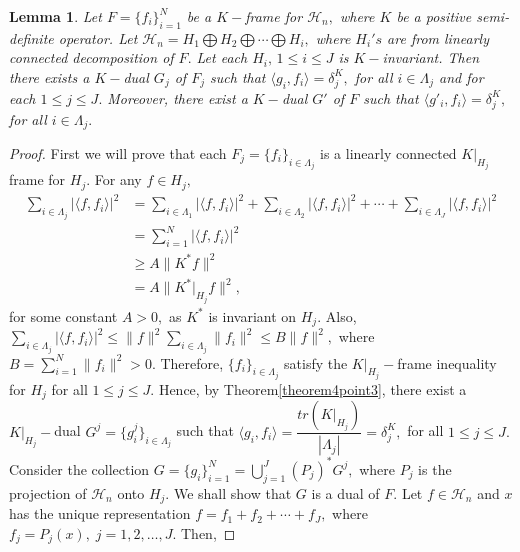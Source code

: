 \documentclass[final,1p,times]{elsarticle}
\newtheorem{lem}[thm]{Lemma}
\begin{document}
\begin{lem}\label{lemma4point10}
		Let $F = \{f_i\}_{i=1}^N $ be a $K-$frame for $\mathcal{H}_n,$ where $K$ be a positive semi-definite operator. Let $\mathcal{H}_n = H_1 \bigoplus H_2 \bigoplus \cdots \bigoplus H_i,$ where  ${H_i}'s$ are from linearly connected decomposition of $F.$ Let each $H_i,\,1\leq i \leq J$ is $K-$invariant. Then there exists a $K-$dual $G_j$ of $F_j$ such that $\langle g_i, f_i \rangle = \delta_{j}^K,$ for all $i \in \Lambda_j$ and for each $1 \leq j \leq J.$
		Moreover, there exist a $K-$dual $G'$ of $F$ such that $\langle g'_i , f_i \rangle = \delta_{j}^K,$ for all $i \in \Lambda_j.$ 
\end{lem}

\begin{proof}
	First we will prove that each $F_j = \{f_i\}_{i \in \Lambda_j}  $ is a linearly connected $K|_{H_j}$ frame for $H_j.$ For any $f \in H_j,$
	\begin{align*}
		\sum\limits_{i \in \Lambda_j}|\langle f,f_i \rangle|^2 &= \sum\limits_{i \in \Lambda_1}|\langle f,f_i \rangle|^2 + \sum\limits_{i \in \Lambda_2}|\langle f,f_i \rangle|^2 + \cdots + \sum\limits_{i \in \Lambda_J}|\langle f,f_i \rangle|^2 \\&= \sum\limits_{i =1}^N|\langle f,f_i \rangle|^2 \\&\geq A\|K^*f\|^2 \\&= A\|K^*|_{H_j}f\|^2,
	\end{align*}
for some constant $A>0,$ as $K^*$ is invariant on $H_j.$ Also, $	\sum\limits_{i \in \Lambda_j}|\langle f,f_i \rangle|^2 \leq \|f\|^2 \sum\limits_{i \in \Lambda_j}\|f_i\|^2 \leq B\|f\|^2,$ where $B=\sum\limits_{i=1}^N\|f_i\|^2>0.$ Therefore, $\{f_i\}_{i \in \Lambda_j}$ satisfy the $K|_{H_j}-$frame inequality for $H_j$ for all $1 \leq j \leq J.$ Hence, by Theorem\ref{theorem4point3}, there exist a $K|_{H_j}-$dual $G^j= \{g^j_{i}\}_{i\in \Lambda_j}$ such that $\langle g_i, f_i \rangle = \dfrac{tr(K|_{H_j})}{|\Lambda_j|}= \delta_{j}^K,$ for all $1 \leq j \leq J.$\\

Consider the collection $G= \{g_i\}_{i=1}^N =\bigcup\limits_{j=1}^J (P_{j})^* G^j,$ where $P_j$ is the projection of $\mathcal{H}_n$ onto $H_j.$ We shall show that $G$ is a dual of $F.$  Let $f \in \mathcal{H}_n$ and $x$ has the unique representation $f=f_1 + f_2 +\cdots + f_J,$ where $f_j = P_j(x),\; j=1,2,\ldots,J.$ Then,


\end{proof}
\end{document}
